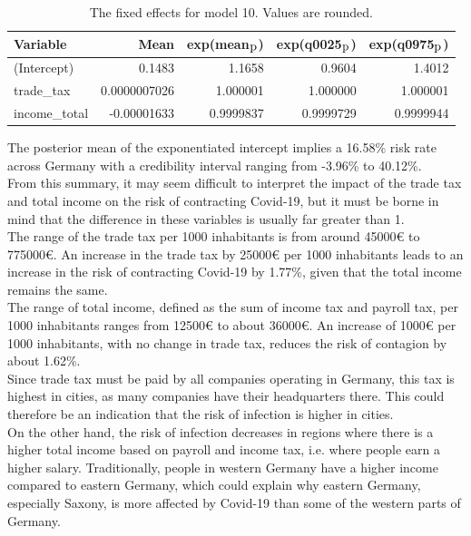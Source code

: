 \begin{table}[H] 
\caption{The fixed effects for model 10. Values are rounded. \label{fixedDemoGermany}}
\begin{tabular}{l r r r r}
\toprule
\textbf{Variable}	& \textbf{Mean}	& \textbf{exp(mean$_{\hbox{p}}$)} & \textbf{exp(q0025$_{\hbox{p}}$)} & \textbf{exp(q0975$_{\hbox{p}}$)} \\
\midrule
(Intercept) & 0.1483 & 1.1658 & 0.9604 & 1.4012\\
trade\_tax & 0.0000007026 & 1.000001  & 1.000000  & 1.000001 \\
income\_total & -0.00001633 & 0.9999837 & 0.9999729 & 0.9999944\\
\bottomrule
\end{tabular}
\end{table}
The posterior mean of the exponentiated intercept implies a 16.58\% risk rate across Germany with a credibility interval ranging from -3.96\% to 40.12\%.  \\
From this summary, it may seem difficult to interpret the impact of the trade tax and total income on the risk of contracting Covid-19, but it must be borne in mind that the difference in these variables is usually far greater than 1. \\
The range of the trade tax per 1000 inhabitants is from around 45000€ to 775000€. An increase in the trade tax by 25000€ per 1000 inhabitants leads to an increase in the risk of contracting Covid-19 by 1.77\%, given that the total income remains the same. \\
The range of total income, defined as the sum of income tax and payroll tax, per 1000 inhabitants ranges from 12500€ to about 36000€. An increase of 1000€ per 1000 inhabitants, with no change in trade tax, reduces the risk of contagion by about 1.62\%. \\
Since trade tax must be paid by all companies operating in Germany, this tax is highest in cities, as many companies have their headquarters there. This could therefore be an indication that the risk of infection is higher in cities. \\
On the other hand, the risk of infection decreases in regions where there is a higher total income based on payroll and income tax, i.e. where people earn a higher salary. Traditionally, people in western Germany have a higher income compared to eastern Germany, which could explain why eastern Germany, especially Saxony, is more affected by Covid-19 than some of the western parts of Germany.
